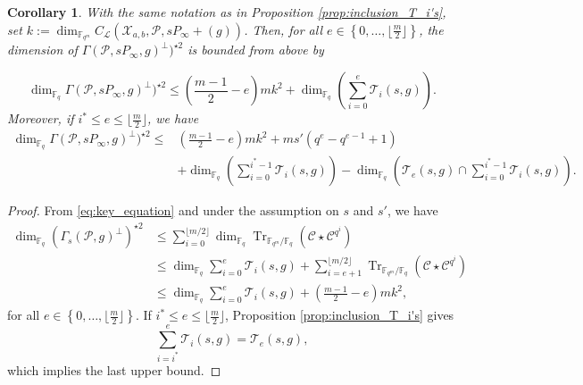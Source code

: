 \documentclass[a4paper]{article}
\newtheorem{coro}[thm]{Corollary}
\theoremstyle{definition}
\theoremstyle{remark}
\newcommand{\calP}{\mathcal{P}}
\newcommand{\calL}{\mathcal{L}}
\newcommand{\calC}{\mathcal{C}}
\newcommand{\calT}{\mathcal{T}}
\newcommand{\calX}{\mathcal{X}}
\newcommand{\fqm}{\mathbb{F}_{q^m}}
\newcommand{\fq}{\mathbb{F}_{q}}
\newcommand{\Tr}[1]{\operatorname{Tr}_{\mathbb{F}_{q^m}/\fq}\left(#1\right)}
\newcommand{\set}[1]{\left\{#1\right\}}
\newcommand\mathieu[1]{\textcolor{brown}{#1}}
\begin{document}
\begin{coro} \label{coro:folklore_upper_bound}
 With the same notation as in Proposition \ref{prop:inclusion_T_i's}, set $k:=\dim_{\fqm}C_{\calL}(\calX_{a,b},\calP,sP_\infty+(g))$.
 Then, for all $e \in \set{0,\dots,\lfloor \frac{m}{2} \rfloor}$, the dimension of $\Gamma(\calP,sP_\infty,g)^{\perp})^{\star 2}$ is bounded from above by
 
\[\dim_{\fq} \Gamma(\calP,sP_\infty,g)^{\perp})^{\star 2} \leq   \left(\frac{m-1}{2}-e\right)mk^2+\dim_{\fq}\left(\sum\limits_{i=0}^e \calT_i(s,g) \right). \]
 Moreover, if $i^* \leq e \leq \lfloor \frac{m}{2} \rfloor$, we have 
 \begin{align*}
  \dim_{\fq} \Gamma(\calP,sP_\infty,g)^{\perp})^{\star 2} \leq   & \left(\frac{m-1}{2}-e\right)mk^2 + ms'(q^e-q^{e-1}+1) \\
  & + \dim_{\fq}\left(\sum\limits_{i=0}^{i^*-1} \calT_i(s,g)\right) - \dim_{\fq} \left( \calT_e(s,g) \cap   \sum\limits_{i=0}^{i^*-1} \calT_i(s,g)\right).
 \end{align*}

\end{coro}
%
\begin{proof}
From \eqref{eq:key_equation} and under the assumption on $s$ and $s'$, we have
        \begin{align*}
        \dim_{\fq} (\Gamma_s(\calP,g)^{\perp})^{\star 2}
        & \leq \sum\limits_{i=0}^{\lfloor m/2 \rfloor} \dim_{\fq} \Tr{\calC \star                     \calC^{q^i}} \\
        & \leq \dim_{\fq} \sum\limits_{i=0}^{e}\calT_i(s,g) + \sum\limits_{i=e+1}^{\lfloor m/2 \rfloor} \Tr{\calC \star \calC^{q^i}} \\
                & \leq \dim_{\fq} \sum\limits_{i=0}^{e}\calT_i(s,g) + \left( \frac{m-1}{2} -e \right)mk^2,
        \end{align*}
 for all $e \in \set{0,\dots,\lfloor \frac{m}{2} \rfloor}$. If $i^* \leq e \leq \lfloor \frac{m}{2} \rfloor$,  Proposition \ref{prop:inclusion_T_i's} gives
\[\sum\limits_{i=i^*}^e \calT_i(s,g) = \calT_e(s,g),\]
which implies the last upper bound.
\end{proof}
\end{document}
